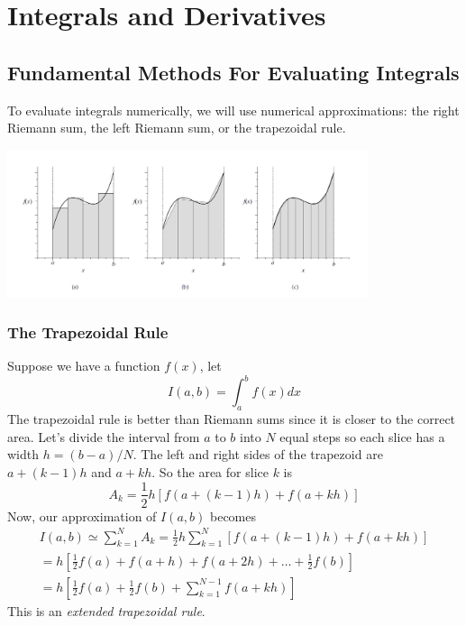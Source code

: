 \chapter{Integrals and Derivatives}
    \section{Fundamental Methods For Evaluating Integrals}
        To evaluate integrals numerically, we will use numerical approximations: the right Riemann sum, the left Riemann sum, or the trapezoidal rule.
        \begin{center}
            \includegraphics[width=300pt]{integral_approx.png}
        \end{center}
        \subsection{The Trapezoidal Rule}
            Suppose we have a function $f(x)$, let
            \begin{equation*}
                I(a, b) = \int_a^b f(x) dx
            \end{equation*}
            The trapezoidal rule is better than Riemann sums since it is closer to the correct area. Let's divide the interval from $a$ to $b$ into $N$ equal steps so each slice has a width $h = (b - a) / N$. The left and right sides of the trapezoid are $a + (k - 1) h$ and $a + kh$. So the area for slice $k$ is
            \begin{equation*}
                A_k = \frac{1}{2}h[f(a + (k - 1)h) + f(a + kh)]
            \end{equation*}
            Now, our approximation of $I(a, b)$ becomes
            \begin{align*}
                I(a, b) \simeq \sum_{k=1}^N A_k = \frac{1}{2}h \sum_{k=1}^N [f(a + (k - 1)h) + f(a + kh)] \\
                 = h[\frac{1}{2}f(a) + f(a + h) + f(a + 2h) + \dots + \frac{1}{2}f(b)] \\
                 = h[\frac{1}{2}f(a) + \frac{1}{2}f(b) + \sum_{k=1}^{N-1}f(a + kh)]
            \end{align*}
            This is an \textit{extended trapezoidal rule}.
